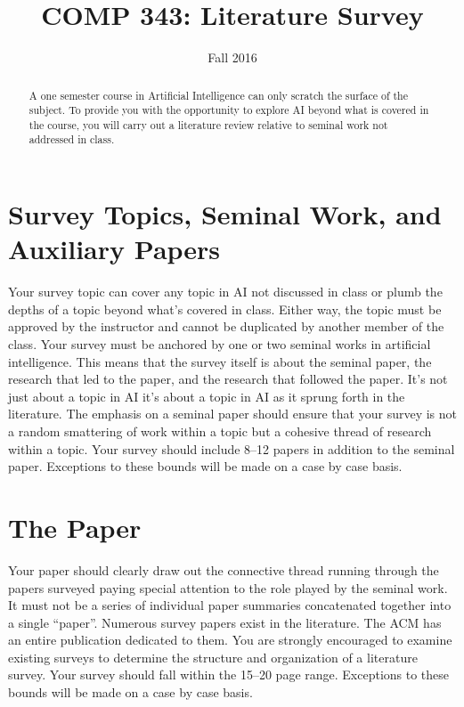 \documentclass[nobib]{tufte-handout}
\title{COMP 343: Literature Survey}
\author{  }
\date{Fall 2016}
\begin{document}
\maketitle

\begin{abstract}
A one semester course in Artificial Intelligence can only scratch the surface of the subject. To provide you with the opportunity to explore AI beyond what is covered in the course, you will carry out a literature review relative to seminal work not addressed in class.
\end{abstract}

\section{Survey Topics, Seminal Work, and Auxiliary Papers}

Your survey topic can cover any topic in AI not discussed in class or plumb the depths of a topic  beyond what's covered in class. Either way, the topic must be approved by the instructor and cannot be duplicated by another member of the class. Your survey must be anchored by one or two seminal works in artificial intelligence.  This means that the survey itself is about the seminal paper, the research that led to the paper, and the research that followed the paper.  It's not just about a topic in AI it's about a topic in AI as it sprung forth in the literature. The emphasis on a seminal paper should ensure that your survey is not a random smattering of work within a topic but a cohesive thread of research within a topic. Your survey should include 8--12 papers in addition to the seminal paper. Exceptions to these bounds will be made on a case by case basis.

\section{The Paper}

Your paper should clearly draw out the connective thread running through the papers surveyed paying special attention to the role played by the seminal work. It must not be a series of individual paper summaries concatenated together into a single ``paper''. Numerous survey papers exist in the literature. The ACM has an entire publication dedicated to them.  You are strongly encouraged to examine existing surveys to determine the structure and organization of a literature survey. Your survey should fall within the 15--20 page range. Exceptions to these bounds will be made on a case by case basis.
\end{document}
